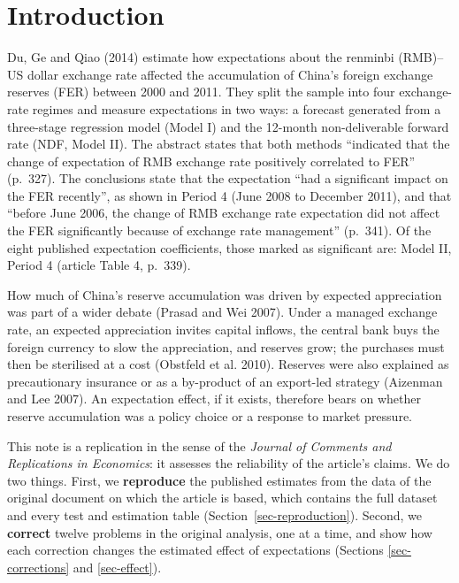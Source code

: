 \documentclass[
  12pt,
  a4paper,
]{article}
\begin{document}
\section{Introduction}\label{sec-intro}

Du, Ge and Qiao (2014) estimate how expectations about the renminbi
(RMB)--US dollar exchange rate affected the accumulation of China's
foreign exchange reserves (FER) between 2000 and 2011. They split the
sample into four exchange-rate regimes and measure expectations in two
ways: a forecast generated from a three-stage regression model (Model I)
and the 12-month non-deliverable forward rate (NDF, Model II). The
abstract states that both methods ``indicated that the change of
expectation of RMB exchange rate positively correlated to FER''
(p.~327). The conclusions state that the expectation ``had a significant
impact on the FER recently'', as shown in Period 4 (June 2008 to
December 2011), and that ``before June 2006, the change of RMB exchange
rate expectation did not affect the FER significantly because of
exchange rate management'' (p.~341). Of the eight published expectation
coefficients, those marked as significant are: Model II, Period 4
(article Table 4, p.~339).

How much of China's reserve accumulation was driven by expected
appreciation was part of a wider debate (Prasad and Wei 2007). Under a
managed exchange rate, an expected appreciation invites capital inflows,
the central bank buys the foreign currency to slow the appreciation, and
reserves grow; the purchases must then be sterilised at a cost (Obstfeld
et al. 2010). Reserves were also explained as precautionary insurance or
as a by-product of an export-led strategy (Aizenman and Lee 2007). An
expectation effect, if it exists, therefore bears on whether reserve
accumulation was a policy choice or a response to market pressure.

This note is a replication in the sense of the \emph{Journal of Comments
and Replications in Economics}: it assesses the reliability of the
article's claims. We do two things. First, we \textbf{reproduce} the
published estimates from the data of the original document on which the
article is based, which contains the full dataset and every test and
estimation table (Section~\ref{sec-reproduction}). Second, we
\textbf{correct} twelve problems in the original analysis, one at a
time, and show how each correction changes the estimated effect of
expectations (Sections \ref{sec-corrections} and \ref{sec-effect}).
\end{document}
